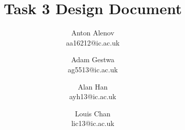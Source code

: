 \documentclass[11pt]{article}
\begin{document}
\title{Task 3 Design Document}
\author{Anton Alenov\\aa16212@ic.ac.uk \and Adam Gestwa\\ag5513@ic.ac.uk \and Alan Han\\ayh13@ic.ac.uk \and Louis Chan\\lic13@ic.ac.uk}

\maketitle


\newpage

\newpage

\end{document}
